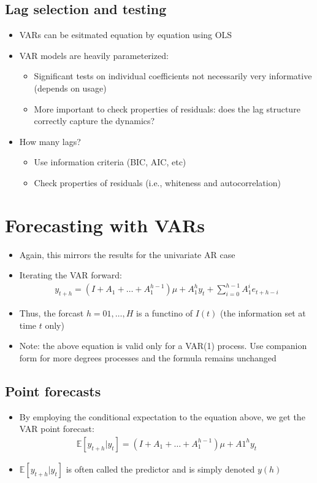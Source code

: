 \documentclass[10pt]{article}
\begin{document}
\subsection{Lag selection and testing}
\begin{itemize}
    \item VARs can be esitmated equation by equation using OLS 
    \item VAR models are heavily parameterized: 
    \begin{itemize}
        \item Significant tests on individual coefficients not necessarily very informative (depends on usage)
        \item More important to check properties of residuals: does the lag structure correctly capture the dynamics?
    \end{itemize}
    \item How many lags?
    \begin{itemize}
        \item Use information criteria (BIC, AIC, etc)
        \item Check properties of residuals (i.e., whiteness and autocorrelation)
    \end{itemize}
\end{itemize}
\section{Forecasting with VARs}
\begin{itemize}
    \item Again, this mirrors the results for the univariate AR case 
    \item Iterating the VAR forward: 
    \begin{gather*}
        y_{t + h} = \left(I + A_1 + \dots + A_1^{h - 1}\right)\mu + A_1^hy_t + \sum_{i = 0}^{h - 1}A_1^ie_{t + h - i}
    \end{gather*}
    \item Thus, the forcast $h = 01, \dots, H $ is a functino of $I(t) $ (the information set at time $t $ only)
    \item Note: the above equation is valid only for a VAR(1) process. Use companion form for more degrees processes and the formula remains unchanged 
\end{itemize}
\subsection{Point forecasts}
\begin{itemize}
    \item By employing the conditional expectation to the equation above, we get the VAR point forecast: 
    \begin{gather*}
        \mathbb{E}[y_{t + h}|y_t] = \left(I + A_1 + \dots + A_1^{h - 1}\right)\mu + A1^hy_t
    \end{gather*}
    \item $\mathbb{E}[y_{t + h}|y_t] $ is often called the predictor and is simply denoted $y(h)$
\end{itemize}
\end{document}
